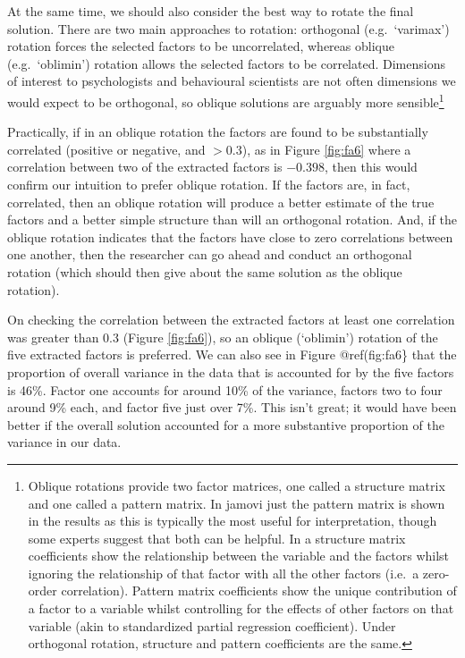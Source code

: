 \documentclass[
]{book}
\begin{document}
At the same time, we should also consider the best way to rotate the final solution. There are two main approaches to rotation: orthogonal (e.g.~`varimax') rotation forces the selected factors to be uncorrelated, whereas oblique (e.g.~`oblimin') rotation allows the selected factors to be correlated. Dimensions of interest to psychologists and behavioural scientists are not often dimensions we would expect to be orthogonal, so oblique solutions are arguably more sensible\footnote{Oblique rotations provide two factor matrices, one called a structure matrix and one called a pattern matrix. In jamovi just the pattern matrix is shown in the results as this is typically the most useful for interpretation, though some experts suggest that both can be helpful. In a structure matrix coefficients show the relationship between the variable and the factors whilst ignoring the relationship of that factor with all the other factors (i.e.~a zero-order correlation). Pattern matrix coefficients show the unique contribution of a factor to a variable whilst controlling for the effects of other factors on that variable (akin to standardized partial regression coefficient). Under orthogonal rotation, structure and pattern coefficients are the same.}

Practically, if in an oblique rotation the factors are found to be substantially correlated (positive or negative, and \(>0.3\)), as in Figure \ref{fig:fa6} where a correlation between two of the extracted factors is \(-0.398\), then this would confirm our intuition to prefer oblique rotation. If the factors are, in fact, correlated, then an oblique rotation will produce a better estimate of the true factors and a better simple structure than will an orthogonal rotation. And, if the oblique rotation indicates that the factors have close to zero correlations between one another, then the researcher can go ahead and conduct an orthogonal rotation (which should then give about the same solution as the oblique rotation).

On checking the correlation between the extracted factors at least one correlation was greater than 0.3 (Figure \ref{fig:fa6}), so an oblique (`oblimin') rotation of the five extracted factors is preferred. We can also see in Figure @ref(fig:fa6\} that the proportion of overall variance in the data that is accounted for by the five factors is 46\%. Factor one accounts for around 10\% of the variance, factors two to four around 9\% each, and factor five just over 7\%. This isn't great; it would have been better if the overall solution accounted for a more substantive proportion of the variance in our data.
\end{document}
